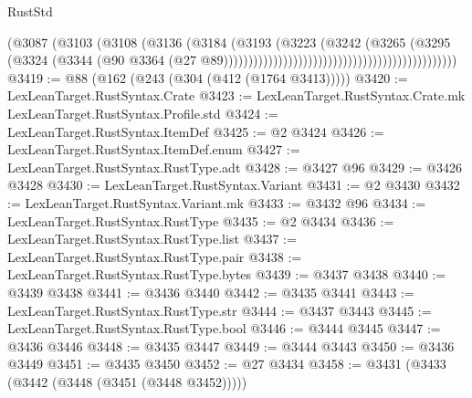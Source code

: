 \begin{lexlean}{RustStd}
\begin{coremodule}
                                                                      (@3087
                                                                        (@3103
                                                                          (@3108
                                                                            (@3136
                                                                              (@3184
                                                                                (@3193
                                                                                  (@3223
                                                                                    (@3242
                                                                                      (@3265
                                                                                        (@3295
                                                                                          (@3324
                                                                                            (@3344
                                                                                              (@90
                                                                                                @3364
                                                                                                (@27
                                                                                                  @89)))))))))))))))))))))))))))))))))))))))))))))))
@3419 := @88 (@162 (@243 (@304 (@412 (@1764 @3413)))))
@3420 := LexLeanTarget.RustSyntax.Crate
@3423 := LexLeanTarget.RustSyntax.Crate.mk LexLeanTarget.RustSyntax.Profile.std
@3424 := LexLeanTarget.RustSyntax.ItemDef
@3425 := @2 @3424
@3426 := LexLeanTarget.RustSyntax.ItemDef.enum
@3427 := LexLeanTarget.RustSyntax.RustType.adt
@3428 := @3427 @96
@3429 := @3426 @3428
@3430 := LexLeanTarget.RustSyntax.Variant
@3431 := @2 @3430
@3432 := LexLeanTarget.RustSyntax.Variant.mk
@3433 := @3432 @96
@3434 := LexLeanTarget.RustSyntax.RustType
@3435 := @2 @3434
@3436 := LexLeanTarget.RustSyntax.RustType.list
@3437 := LexLeanTarget.RustSyntax.RustType.pair
@3438 := LexLeanTarget.RustSyntax.RustType.bytes
@3439 := @3437 @3438
@3440 := @3439 @3438
@3441 := @3436 @3440
@3442 := @3435 @3441
@3443 := LexLeanTarget.RustSyntax.RustType.str
@3444 := @3437 @3443
@3445 := LexLeanTarget.RustSyntax.RustType.bool
@3446 := @3444 @3445
@3447 := @3436 @3446
@3448 := @3435 @3447
@3449 := @3444 @3443
@3450 := @3436 @3449
@3451 := @3435 @3450
@3452 := @27 @3434
@3458 := @3431 (@3433 (@3442 (@3448 (@3451 (@3448 @3452)))))

\end{coremodule}
\end{lexlean}
